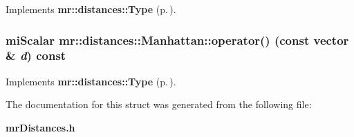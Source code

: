 Implements {\bf mr::distances::Type} {\rm (p.\,\pageref{structmr_1_1distances_1_1Type_a1})}.
\subsubsection{\setlength{\rightskip}{0pt plus 5cm}mi\-Scalar mr::distances::Manhattan::operator() (const {\bf vector} \& {\em d}) const\hspace{0.3cm}{\tt  [inline, virtual]}}\label{structmr_1_1distances_1_1Manhattan_a0}




Implements {\bf mr::distances::Type} {\rm (p.\,\pageref{structmr_1_1distances_1_1Type_a0})}.

The documentation for this struct was generated from the following file:\begin{CompactItemize}
\item 
{\bf mr\-Distances.h}\end{CompactItemize}
